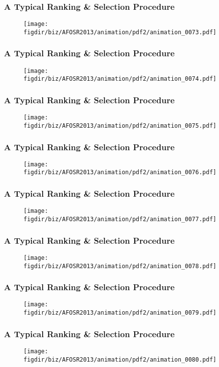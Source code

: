 \documentclass[13pt]{beamer}
\newcommand{\figdir}{../../fig}
\begin{document}
\begin{frame}\frametitle{A Typical Ranking \& Selection Procedure}\begin{figure}\texttt{[image: \\figdir/biz/AFOSR2013/animation/pdf2/animation\_0073.pdf]}\end{figure}\end{frame}
\begin{frame}\frametitle{A Typical Ranking \& Selection Procedure}\begin{figure}\texttt{[image: \\figdir/biz/AFOSR2013/animation/pdf2/animation\_0074.pdf]}\end{figure}\end{frame}
\begin{frame}\frametitle{A Typical Ranking \& Selection Procedure}\begin{figure}\texttt{[image: \\figdir/biz/AFOSR2013/animation/pdf2/animation\_0075.pdf]}\end{figure}\end{frame}
\begin{frame}\frametitle{A Typical Ranking \& Selection Procedure}\begin{figure}\texttt{[image: \\figdir/biz/AFOSR2013/animation/pdf2/animation\_0076.pdf]}\end{figure}\end{frame}
\begin{frame}\frametitle{A Typical Ranking \& Selection Procedure}\begin{figure}\texttt{[image: \\figdir/biz/AFOSR2013/animation/pdf2/animation\_0077.pdf]}\end{figure}\end{frame}
\begin{frame}\frametitle{A Typical Ranking \& Selection Procedure}\begin{figure}\texttt{[image: \\figdir/biz/AFOSR2013/animation/pdf2/animation\_0078.pdf]}\end{figure}\end{frame}
\begin{frame}\frametitle{A Typical Ranking \& Selection Procedure}\begin{figure}\texttt{[image: \\figdir/biz/AFOSR2013/animation/pdf2/animation\_0079.pdf]}\end{figure}\end{frame}
\begin{frame}\frametitle{A Typical Ranking \& Selection Procedure}\begin{figure}\texttt{[image: \\figdir/biz/AFOSR2013/animation/pdf2/animation\_0080.pdf]}\end{figure}\end{frame}
\end{document}
